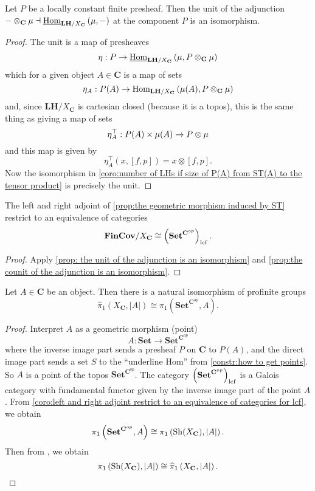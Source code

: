 \begin{proposition}
\label{prop: the unit of the adjunction is an isomorphism}
Let $P$ be a locally constant finite presheaf. Then the unit of the adjunction $-\otimes_{\mathbf{C}} \operatorname{\mu} \dashv \underline{\operatorname{Hom}}_{\mathbf{LH}/X_{\mathbf{C}}}\left(\operatorname{\mu},-\right)$ at the component $P$ is an isomorphism.
\end{proposition}
\begin{proof}
The unit is a map of presheaves
\begin{equation}
\label{eq:the unit of the adjunction equation}
\eta : P \to \underline{\operatorname{Hom}}_{\mathbf{LH}/X_{\mathbf{C}}}\left(\operatorname{\mu}, P\otimes_{\mathbf{C}} \operatorname{\mu}\right)
\end{equation}
which for a given object $A \in \mathbf{C}$ is a map of sets
\[ \eta_A : P(A) \to \operatorname{Hom}_{\mathbf{LH}/X_{\mathbf{C}}}\left(\operatorname{\mu}(A), P \otimes_{\mathbf{C}} \operatorname{\mu}\right) \]
and, since $\mathbf{LH}/X_{\mathbf{C}}$ is cartesian closed (because it is a topos), this is the same thing as giving a map of sets
\[ \eta_A^\top : P(A) \times \operatorname{\mu}(A) \to P \otimes \operatorname{\mu} \]
and this map is given by
\[ \eta_A^\top(x, [f,p]) = x \otimes [f,p]. \]
Now the isomorphism in \cref{coro:number of LHs if size of P(A) from ST(A) to the tensor product} is precisely the unit.
\end{proof}

\begin{corollary}
\label{coro:left and right adjoint restrict to an equivalence of categories for lcf}
The left and right adjoint of \cref{prop:the geometric morphism induced by ST} restrict to an equivalence of categories
\[ \mathbf{FinCov}/X_{\mathbf{C}} \cong \left(\mathbf{Set}^{\mathbf{C}^{op}}\right)_{\operatorname{lcf}}. \]
\end{corollary}
\begin{proof}
Apply \cref{prop: the unit of the adjunction is an isomorphism} and \cref{prop:the counit of the adjunction is an isomorphism}.
\end{proof}

\begin{corollary}
\label{coro:isomorphism of profinite groups}
Let $A \in \mathbf{C}$ be an object. Then there is a natural isomorphism of profinite groups
\[ \widehat{\pi}_1\left(X_\mathbf{C}, |A|\right) \cong \pi_1 \left( \mathbf{Set}^{\mathbf{C}^{op}}, A \right). \]
\end{corollary}
\begin{proof}
Interpret $A$ as a geometric morphism (point)
\[ A : \mathbf{Set} \to \mathbf{Set}^{\mathbf{C}^{op}} \]
where the inverse image part sends a presheaf $P$ on $\mathbf{C}$ to $P(A)$, and the direct image part sends a set $S$ to the ``underline Hom'' from \cref{constr:how to get points}. So $A$ is a point of the topos $\mathbf{Set}^{\mathbf{C}^{op}}$.
The category $\left(\mathbf{Set}^{\mathbf{C}^{op}}\right)_{\operatorname{lcf}}$ is a Galois category with fundamental functor given by the inverse image part of the point $A$. From \cref{coro:left and right adjoint restrict to an equivalence of categories for lcf}, we obtain
\[ \pi_1 \left( \mathbf{Set}^{\mathbf{C}^{op}}, A \right) \cong \pi_1 \left( \operatorname{Sh}(X_\mathbf{C}), |A| \right). \]
Then from \cite[Theorem 1.15, or 3.10]{lenstra08}, we obtain
\[ \pi_1 \left( \operatorname{Sh}(X_\mathbf{C}), |A| \right) \cong \widehat{\pi}_1\left(X_\mathbf{C}, |A|\right). \]
\end{proof}

